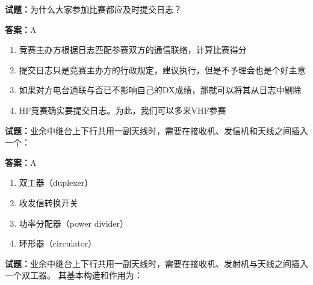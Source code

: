 \documentclass{ctexbook}
\begin{document}




\vspace{1em}

\textbf{试题：}为什么大家参加比赛都应及时提交日志？ 

\textbf{答案：}A 

\begin{enumerate}[leftmargin=3em]
  \item 竞赛主办方根据日志匹配参赛双方的通信联络，计算比赛得分 

  \item 提交日志只是竞赛主办方的行政规定，建议执行，但是不予理会也是个好主意 

  \item 如果对方电台通联与否已不影响自己的DX成绩，那就可以将其从日志中剔除 

  \item HF竞赛确实要提交日志。为此，我们可以多来VHF参赛 

\end{enumerate}





\vspace{1em}

\textbf{试题：}业余中继台上下行共用一副天线时，需要在接收机、发信机和天线之间插入一个： 

\textbf{答案：}A 

\begin{enumerate}[leftmargin=3em]
  \item 双工器（duplexer） 

  \item 收发信转换开关 

  \item 功率分配器（power divider） 

  \item 环形器（circulator） 

\end{enumerate}





\vspace{1em}

\textbf{试题：}业余中继台上下行共用一副天线时，需要在接收机、发射机与天线之间插入一个双工器。
其基本构造和作用为： 
\end{document}
